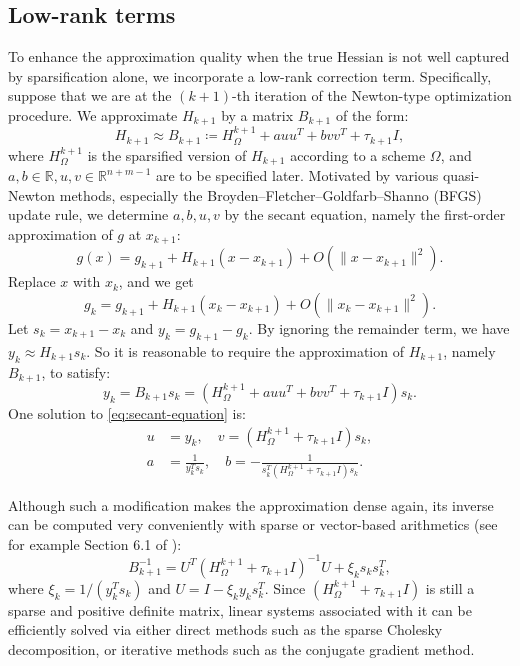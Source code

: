 \documentclass{article}
\theoremstyle{plain}
\theoremstyle{definition}
\theoremstyle{remark}
\begin{document}
\subsection{Low-rank terms}
To enhance the approximation quality when the true Hessian is not well captured by sparsification alone, we incorporate a low-rank correction term. Specifically, suppose that we are at the $(k+1)$-th iteration of the Newton-type optimization procedure. We approximate $H_{k+1}$ by a matrix $B_{k+1}$ of the form:
\begin{equation*}
\label{eq:BFGS-update}
    H_{k+1} \approx B_{k+1} \coloneqq H_{\Omega}^{k+1} + auu^T + bvv^T + \tau_{k+1} I,
\end{equation*}
where $H_{\Omega}^{k+1}$ is the sparsified version of $H_{k+1}$ according to a scheme $\Omega$, and $a, b \in \mathbb{R}, u, v \in \mathbb{R}^{n+m-1}$ are to be specified later. Motivated by various quasi-Newton methods, especially the Broyden--Fletcher--Goldfarb--Shanno (BFGS) update rule, we determine $a, b, u, v$ by the secant equation, namely the first-order approximation of $g$ at $x_{k+1}$:
\begin{equation*}
    g(x) = g_{k+1} + H_{k+1}(x - x_{k+1}) + O(\|x - x_{k+1}\|^2).
\end{equation*}
Replace $x$ with $x_k$, and we get
\begin{equation*}
    g_k = g_{k+1} + H_{k+1}(x_k - x_{k+1}) + O(\|x_{k} - x_{k+1}\|^2).
\end{equation*}
Let $s_k = x_{k+1} - x_k$ and $y_k = g_{k+1} - g_k$. By ignoring the remainder term, we have $y_k \approx H_{k+1}s_k$.
So it is reasonable to require the approximation of $H_{k+1}$, namely $B_{k+1}$, to satisfy:
\begin{equation}
\label{eq:secant-equation}
    y_k = B_{k+1}s_k = (H_{\Omega}^{k+1} + auu^T + bvv^T + \tau_{k+1} I)s_k.
\end{equation}
One solution to \eqref{eq:secant-equation} is:
\begin{align}
u & =y_{k},\quad v=(H_{\Omega}^{k+1}+\tau_{k+1}I)s_{k},\nonumber \\
a & =\frac{1}{y_{k}^{T}s_{k}},\quad b=-\frac{1}{s_{k}^{T}(H_{\Omega}^{k+1}+\tau_{k+1}I)s_{k}}. \label{eq:secant-equation-solution}
\end{align}

Although such a modification makes the approximation dense again, its inverse can be computed very conveniently with sparse or vector-based arithmetics (see for example Section 6.1 of \citealp{nocedal2006numerical}):
\[
B_{k+1}^{-1}=U^{T}(H_{\Omega}^{k+1}+\tau_{k+1} I)^{-1}U+\xi_k s_{k}s_{k}^{T},
\]
where $\xi_k=1/(y_k^T s_k)$ and $U=I-\xi_k y_{k}s_{k}^{T}$. Since $(H_{\Omega}^{k+1}+\tau_{k+1} I)$ is still a sparse and positive definite matrix, linear systems associated with it can be efficiently solved via either direct methods such as the sparse Cholesky decomposition, or iterative methods such as the conjugate gradient method.
\end{document}
